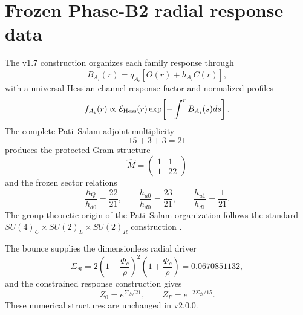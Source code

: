 \documentclass[11pt]{article}
\begin{document}
\section{Frozen Phase-B2 radial response data}
The v1.7 construction organizes each family response through
\begin{equation}
B_{A_i}(r)=q_{A_i}\left[O(r)+h_{A_i}C(r)\right],
\end{equation}
with a universal Hessian-channel response factor and normalized profiles
\begin{equation}
f_{A_i}(r)\propto {\cal E}_{\rm Hess}(r)
\exp\!\left[-\int^r B_{A_i}(s)ds\right].
\end{equation}
The complete Pati--Salam adjoint multiplicity
\begin{equation}
15+3+3=21
\end{equation}
produces the protected Gram structure
\begin{equation}
\widehat M=\begin{pmatrix}1&1\\1&22\end{pmatrix}
\end{equation}
and the frozen sector relations
\begin{equation}
\frac{h_Q}{h_{d0}}=\frac{22}{21},\qquad
\frac{h_{u0}}{h_{d0}}=\frac{23}{21},\qquad
\frac{h_{u1}}{h_{d1}}=\frac1{21}.
\end{equation}
The group-theoretic origin of the Pati--Salam organization follows the standard $SU(4)_C\times SU(2)_L\times SU(2)_R$ construction \cite{PatiSalam1974}.

The bounce supplies the dimensionless radial driver
\begin{equation}
\boxed{\Sigma_{\mathcal B}=2\left(1-\frac{\Phi_c}{\rho}\right)^2\left(1+\frac{\Phi_c}{\rho}\right)=0.0670851132,}
\end{equation}
and the constrained response construction gives
\begin{equation}
Z_0=e^{\Sigma_{\mathcal B}/21},\qquad
Z_F=e^{-2\Sigma_{\mathcal B}/15}.
\end{equation}
These numerical structures are unchanged in v2.0.0.
\end{document}
